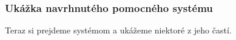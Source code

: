 \documentclass{beamer}
\begin{document}
\begin{frame}
  \frametitle{Ukážka navrhnutého pomocného systému}
  Teraz si prejdeme systémom a ukážeme niektoré z jeho častí.
\end{frame}





\end{document}
